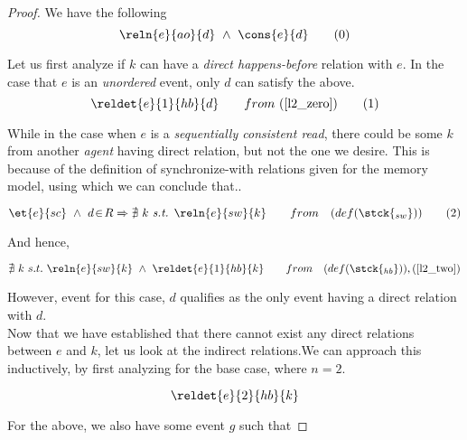 

 \begin{proof}
       
        We have the following
        \[
            \reln{e}{ao}{d} \ \wedge \ \cons{e}{d} 
            \tag{0}
            \label{l2_zero}
        \]
       
       
        Let us first analyze if $k$ can have a \textit{direct happens-before} relation with $e$. In the case that $e$ is an \textit{unordered} event, only $d$ can satisfy the above. 
            \[
                \reldet{e}{1}{hb}{d} \qquad 
                from \  
                (\ref{l2_zero})
                \tag{1}
                \label{l2_one}
            \]
        
        While in the case when $e$ is a \textit{sequentially consistent read}, there could be some $k$ from another \textit{agent} having direct relation, but not the one we desire. This is because of the definition of synchronize-with relations given for the memory model, using which we can conclude that.. 
        
        \[
            \et{e}{sc} \ \wedge \ d \!\in \! R \Rightarrow 
            \nexists \ k \ \textit{s.t. }
            \reln{e}{sw}{k} \qquad
            from \quad
            (def(\stck{_{sw}}))
            \tag{2}
            \label{l2_two}
        \]
        
        And hence, 
        
        \[
            \nexists \ k \ s.t. \
            \reln{e}{sw}{k} \ \wedge \  
            \reldet{e}{1}{hb}{k} \qquad
            from \quad 
            (def(\stck{_{hb}})),
            (\ref{l2_two})
        \]
        
        However, event for this case, $d$ qualifies as the only event having a direct relation with $d$. \\
        
        Now that we have established that there cannot exist any direct relations between $e$ and $k$, let us look at the indirect relations.We can approach this inductively, by first analyzing for the base case, where $n=2$.
        
        \[
            \reldet{e}{2}{hb}{k}
        \]
        
        For the above, we also have some event $g$ such that
        

\end{proof}

